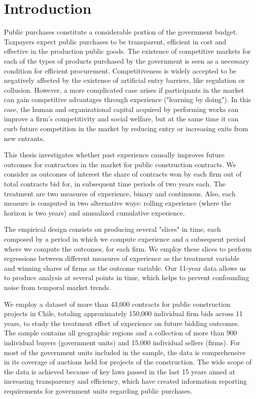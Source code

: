 \chapter{Introduction}
Public purchases constitute a considerable portion of the government budget. Taxpayers expect public purchases to be transparent, efficient in cost and effective in the production public goods. The existence of competitive markets for each of the types of products purchased by the government is seen as a necessary condition for efficient procurement. Competitiveness is widely accepted to be negatively affected by the existence of artificial entry barriers, like regulation or collusion. However, a more complicated case arises if participants in the market can gain competitive advantages through experience ("learning by doing"). In this case, the human and organizational capital acquired by performing works can improve a firm's competitivity and social welfare, but at the same time it can curb future competition in the market by reducing entry or increasing exits from new entrants.

This thesis investigates whether past experience causally improves future outcomes for contractors in the market for public construction contracts.  We consider as outcomes of interest the share of contracts won by each firm out of total contracts bid for, in subsequent time periods of two years each. The treatment are two measures of experience, binary and continuous. Also, each measure is computed in two alternative ways: rolling experience (where the horizon is two years) and annualized cumulative experience.

The empirical design consists on producing several "slices" in time, each composed by a period in which we compute experience and a subsequent period where we compute the outcomes, for each firm. We employ these slices to perform regressions between different measures of experience as the treatment variable and winning shares of firms as the outcome variable. Our 11-year data allows us to produce analysis at several points in time, which helps to prevent confounding noise from temporal market trends.

We employ a dataset of more than 43,000 contracts for public construction projects in Chile, totaling approximately 150,000 individual firm bids across 11 years, to study the treatment effect of experience on future bidding outcomes. The sample contains all geographic regions and a collection of more than 900 individual buyers (government units) and 15,000 individual sellers (firms). For most of the government units included in the sample, the data is comprehensive in its coverage of auctions held for projects of the construction. The wide scope of the data is achieved because of key laws passed in the last 15 years aimed at increasing transparency and efficiency, which have created information reporting requirements for government units regarding public purchases.

